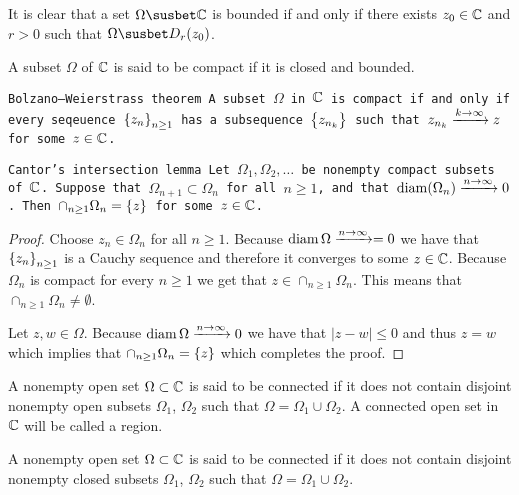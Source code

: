 \documentclass[11pt,a4paper]{article}
\begin{document}
\begin{remark}
    It is clear that a set $\Omega \susbet \C$ is bounded if and only if
    there exists $z_0 \in \mathbb{C}$ and $r > 0$ such that $\Omega \susbet D_r(z_0)$.
\end{remark}

\begin{definition}
    A subset $\Omega$ of $\mathbb{C}$ is said to be compact if it is closed and 
    bounded.
\end{definition}

\begin{theorem}\tt{Bolzano--Weierstrass theorem}
    A subset $\Omega$ in $\mathbb{C}$ is compact if and only if every seqeuence
    $\set{z_n}_{n \geq 1}$ has a subsequence $\set{z_{n_k}}$ such that
    $z_{n_k} \xrightarrow{k \to \infty} z$ for some $z \in \mathbb{C}$.
\end{theorem}

\begin{theorem}\tt{Cantor's intersection lemma}
    Let $\Omega_1, \Omega_2, \dots$ be nonempty compact subsets of $\mathbb{C}$.
    Suppose that $\Omega_{n+1} \subset \Omega_n$ for all $n \geq 1$,
    and that $\operatorname{diam}(\Omega_n) \xrightarrow{n \to \infty} 0$.
    Then $\cap_{n \geq 1} \Omega_n = \set{z}$ for some $z \in \mathbb{C}$.
\end{theorem}
\begin{proof}
    Choose $z_n \in \Omega_n$ for all $n \geq 1$.
    Because $\operatorname{diam} \Omega \xrightarrow{n \to \infty} = 0$ we have that
    $\set{z_n}_{n \geq 1}$ is a Cauchy sequence and therefore it converges
    to some $z \in \mathbb{C}$. Because $\Omega_n$ is compact for every $n \geq 1$
    we get that $z \in \cap_{n \geq 1} \Omega_n$.
    This means that $\cap_{n \geq 1} \Omega_n \neq \emptyset$.

    Let $z,w \in \Omega$.
    Because $\operatorname{diam} \Omega \xrightarrow{n \to \infty} 0$ we have that
    $|z - w| \le 0$ and thus $z = w$ which implies that
    $\cap_{n \geq 1} \Omega_n = \set{z}$ which completes the proof.
\end{proof}

\begin{definition}
    A nonempty open set $\Omega \subset \mathbb{C}$ is said to be connected if it does
    not contain disjoint nonempty open subsets $\Omega_1$, $\Omega_2$ such
    that $\Omega = \Omega_1 \cup \Omega_2$. A connected open set in 
    $\mathbb{C}$ will be called a region.
\end{definition}

\begin{definition}
    A nonempty open set $\Omega \subset \mathbb{C}$ is said to be connected if it does
    not contain disjoint nonempty closed subsets $\Omega_1$, $\Omega_2$ such
    that $\Omega = \Omega_1 \cup \Omega_2$.
\end{definition}
\end{document}
